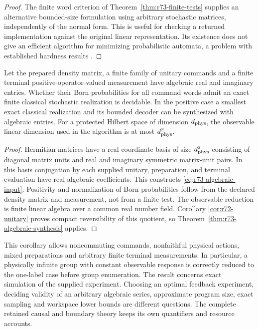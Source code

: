 \begin{proof}
The finite word criterion of Theorem~\ref{thm:r73-finite-tests} supplies
an alternative bounded-size formulation using arbitrary stochastic
matrices, independently of the normal form. This is useful for checking
a returned implementation against the original linear representation.
Its existence does not give an efficient algorithm for minimizing
probabilistic automata, a problem with established hardness results
\cite{KieferWachter14}.
\end{proof}

\begin{corollary}
\label{cor:r73-unitary-algorithm}
Let the prepared density matrix, a finite family of unitary commands and
a finite terminal positive-operator-valued measurement have algebraic
real and imaginary entries. Whether their Born probabilities for all
command words admit an exact finite classical stochastic realization is
decidable. In the positive case a smallest exact classical realization
and its bounded decoder can be synthesized with algebraic entries.
For a protected Hilbert space of dimension $d_{\rm phys}$, the observable
linear dimension used in the algorithm is at most $d_{\rm phys}^2$.
\end{corollary}
\begin{proof}
Hermitian matrices have a real coordinate basis of size
$d_{\rm phys}^2$ consisting of diagonal matrix units and real and
imaginary symmetric matrix-unit pairs. In this basis conjugation by each
supplied unitary, preparation, and terminal evaluation have real algebraic
coefficients. This constructs \eqref{eq:r73-algebraic-input}. Positivity
and normalization of Born probabilities follow from the declared density
matrix and measurement, not from a finite test. The observable reduction
is finite linear algebra over a common real number field. Corollary
\ref{cor:r72-unitary} proves compact reversibility of this quotient, so
Theorem~\ref{thm:r73-algebraic-synthesis} applies.
\end{proof}

This corollary allows noncommuting commands, nonfaithful physical actions,
mixed preparations and arbitrary finite terminal measurements. In
particular, a physically infinite group with constant observable response
is correctly reduced to the one-label case before group enumeration. The
result concerns exact simulation of the supplied experiment. Choosing an
optimal feedback experiment, deciding validity of an arbitrary algebraic
series, approximate program size, exact sampling and workspace lower
bounds are different questions. The complete retained causal and boundary
theory keeps its own quantifiers and resource accounts.
